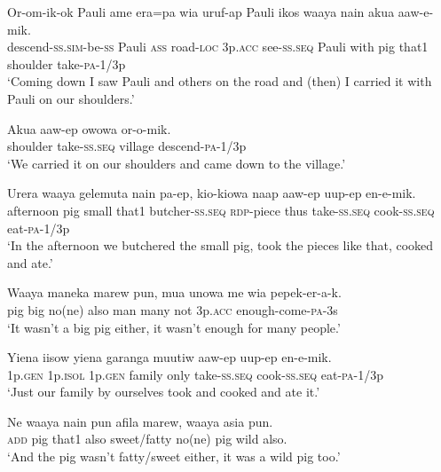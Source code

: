 \ea\label{ex:a:x25}
\gll  Or-om-ik-ok  Pauli  ame  era=pa  wia  uruf-ap  Pauli  ikos             waaya  nain  akua  aaw-e-mik. \\
descend-\textsc{ss}.\textsc{sim}-be-\textsc{ss}  Pauli  \textsc{ass}  road-\textsc{loc}  3p.\textsc{acc}  see-\textsc{ss.seq}  Pauli  with  pig  that1  shoulder  take-\textsc{pa}-1/3p \\


\glt ‘Coming down I saw Pauli and others on the road and (then) I carried it with Pauli on our shoulders.’ \\
\z


\ea\label{ex:a:x26}
\gll  Akua  aaw-ep  owowa  or-o-mik. \\
shoulder  take-\textsc{ss.seq}  village  descend-\textsc{pa}-1/3p \\
\glt ‘We carried it on our shoulders and came down to the village.’ \\
\z


\ea\label{ex:a:x27}
\gll  Urera  waaya  gelemuta  nain  pa-ep,  kio-kiowa  naap  aaw-ep         uup-ep  en-e-mik. \\
afternoon  pig  small  that1  butcher-\textsc{ss.seq}  \textsc{rdp}-piece  thus  take-\textsc{ss.seq}  cook-\textsc{ss.seq}  eat-\textsc{pa}-1/3p \\


\glt ‘In the afternoon we butchered the small pig, took the pieces like that, cooked and ate.’ \\
\z


\ea\label{ex:a:x28}
\gll  Waaya  maneka  marew  pun,  mua  unowa  me  wia  pepek-er-a-k. \\
pig  big  no(ne)  also  man  many  not  3p.\textsc{acc}  enough-come-\textsc{pa}-3s \\
\glt ‘It wasn’t a big pig either, it wasn’t enough for many people.’ \\
\z


\ea\label{ex:a:x29}
\gll  Yiena  iisow  yiena  garanga  muutiw  aaw-ep  uup-ep         en-e-mik. \\
1p.\textsc{gen}  1p.\textsc{isol}  1p.\textsc{gen}  family  only  take-\textsc{ss.seq}  cook-\textsc{ss.seq}    eat-\textsc{pa}-1/3p \\


\glt ‘Just our family by ourselves took and cooked and ate it.’ \\
\z


\ea\label{ex:a:x30}
\gll  Ne  waaya  nain  pun  afila  marew,  waaya  asia  pun. \\
\textsc{add}  pig  that1  also  sweet/fatty  no(ne)  pig  wild  also. \\
\glt ‘And the pig wasn’t fatty/sweet either, it was a wild pig too.’ \\
\z


